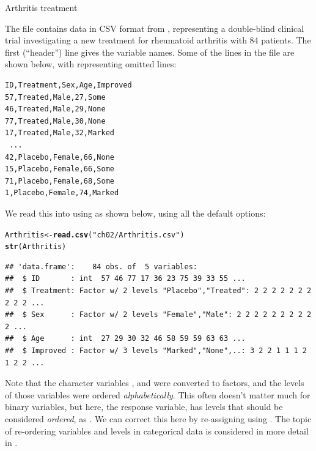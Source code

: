 \documentclass[11pt]{book}\usepackage[]{graphicx}\usepackage[]{color}
\makeatletter
\newcommand{\hlstr}[1]{\textcolor[rgb]{0.192,0.494,0.8}{#1}}%
\newcommand{\hlstd}[1]{\textcolor[rgb]{0.345,0.345,0.345}{#1}}%
\newcommand{\hlkwb}[1]{\textcolor[rgb]{0.69,0.353,0.396}{#1}}%
\newcommand{\hlkwd}[1]{\textcolor[rgb]{0.737,0.353,0.396}{\textbf{#1}}}%
\newenvironment{kframe}{%
 \def\at@end@of@kframe{}%
 \ifinner\ifhmode%
  \def\at@end@of@kframe{\end{minipage}}%
  \begin{minipage}{\columnwidth}%
 \fi\fi%
 \def\FrameCommand##1{\hskip\@totalleftmargin \hskip-\fboxsep
 \colorbox{shadecolor}{##1}\hskip-\fboxsep
     \hskip-\linewidth \hskip-\@totalleftmargin \hskip\columnwidth}%
 \MakeFramed {\advance\hsize-\width
   \@totalleftmargin\z@ \linewidth\hsize
   \@setminipage}}%
 {\par\unskip\endMakeFramed%
 \at@end@of@kframe}
\newenvironment{knitrout}{}{} %
\renewenvironment{knitrout}{\small\renewcommand{\baselinestretch}{.85}}{} %
\makeatother
\begin{document}
\begin{Example}{Arthritis treatment}

The file  contains data in CSV format
from \citet{KochEdwards:88}, representing
a double-blind clinical trial investigating a new treatment for rheumatoid arthritis with 84 patients. The first (``header'') line gives the variable names.  Some of the
lines in the file are shown below, with  representing omitted lines:
{\small
\renewcommand{\baselinestretch}{.85}
\begin{verbatim}
ID,Treatment,Sex,Age,Improved
57,Treated,Male,27,Some
46,Treated,Male,29,None
77,Treated,Male,30,None
17,Treated,Male,32,Marked
 ...
42,Placebo,Female,66,None
15,Placebo,Female,66,Some
71,Placebo,Female,68,Some
1,Placebo,Female,74,Marked
\end{verbatim}
}
We read this into \R using  as shown below, using all the
default options:
\begin{knitrout}\footnotesize
{}\color{fgcolor}\begin{kframe}
\begin{alltt}
\hlstd{Arthritis} \hlkwb{<-} \hlkwd{read.csv}\hlstd{(}\hlstr{"ch02/Arthritis.csv"}\hlstd{)}
\hlkwd{str}\hlstd{(Arthritis)}
\end{alltt}
\begin{verbatim}
## 'data.frame':	84 obs. of  5 variables:
##  $ ID       : int  57 46 77 17 36 23 75 39 33 55 ...
##  $ Treatment: Factor w/ 2 levels "Placebo","Treated": 2 2 2 2 2 2 2 2 2 2 ...
##  $ Sex      : Factor w/ 2 levels "Female","Male": 2 2 2 2 2 2 2 2 2 2 ...
##  $ Age      : int  27 29 30 32 46 58 59 59 63 63 ...
##  $ Improved : Factor w/ 3 levels "Marked","None",..: 3 2 2 1 1 1 2 1 2 2 ...
\end{verbatim}
\end{kframe}
\end{knitrout}

Note that the character variables ,  and 
were converted to factors, and the levels of those variables were
ordered \emph{alphabetically}.  This often doesn't matter much for binary variables,
but here, the response variable,  has levels
that should be considered \emph{ordered}, 
as .  We can correct this here by
re-assigning  using .
The topic of re-ordering variables and levels in categorical data is
considered in more detail in .


\end{Example}
\end{document}

